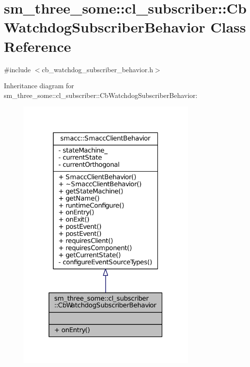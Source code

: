 \hypertarget{classsm__three__some_1_1cl__subscriber_1_1CbWatchdogSubscriberBehavior}{}\section{sm\+\_\+three\+\_\+some\+:\+:cl\+\_\+subscriber\+:\+:Cb\+Watchdog\+Subscriber\+Behavior Class Reference}
\label{classsm__three__some_1_1cl__subscriber_1_1CbWatchdogSubscriberBehavior}


{\ttfamily \#include $<$cb\+\_\+watchdog\+\_\+subscriber\+\_\+behavior.\+h$>$}



Inheritance diagram for sm\+\_\+three\+\_\+some\+:\+:cl\+\_\+subscriber\+:\+:Cb\+Watchdog\+Subscriber\+Behavior\+:
\nopagebreak
\begin{figure}[H]
\begin{center}
\leavevmode
\includegraphics[width=255pt]{classsm__three__some_1_1cl__subscriber_1_1CbWatchdogSubscriberBehavior__inherit__graph}
\end{center}
\end{figure}


